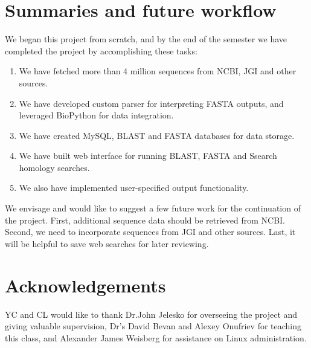 \documentclass[11pt,letterpaper,twoside,english]{article}
\begin{document}
\section{Summaries and future workflow}

We began this project from scratch, and by the end of the semester
we have completed the project by accomplishing these tasks:
\begin{enumerate}
\item We have fetched more than 4 million sequences from NCBI, JGI and other
sources.
\item We have developed custom parser for interpreting FASTA outputs, and
leveraged BioPython for data integration.
\item We have created MySQL, BLAST and FASTA databases for data storage.
\item We have built web interface for running BLAST, FASTA and Ssearch homology
searches.
\item We also have implemented user-specified output functionality.
\end{enumerate}
We envisage and would like to suggest a few future work for the continuation
of the project. First, additional sequence data should be retrieved
from NCBI. Second, we need to incorporate sequences from JGI and other
sources. Last, it will be helpful to save web searches for later reviewing.


\section{Acknowledgements}

YC and CL would like to thank Dr.John Jelesko for overseeing the project
and giving valuable supervision, Dr's David Bevan and Alexey Onufriev
for teaching this class, and Alexander James Weisberg for assistance
on Linux administration.



\end{document}
